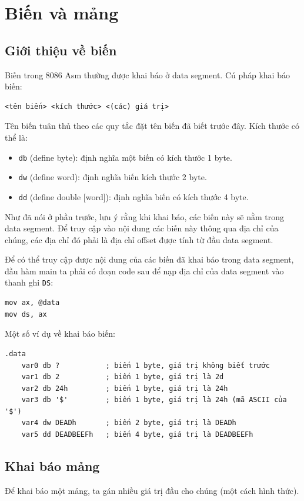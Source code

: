 \documentclass[12pt]{report}
\newcommand{\code}[1]{\texttt{#1}}
\begin{document}
\section{Biến và mảng}
\subsection{Giới thiệu về biến}
Biến trong 8086 Asm thường được khai báo ở data segment.
Cú pháp khai báo biến:
\begin{verbatim}
<tên biến> <kích thước> <(các) giá trị>
\end{verbatim}

Tên biến tuân thủ theo các quy tắc đặt tên biến đã biết trước đây.
Kích thước có thể là:
\begin{itemize}
    \item \code{db} (define byte): định nghĩa một biến có kích thước 1 byte.
    \item \code{dw} (define word): định nghĩa biến kích thước 2 byte.
    \item \code{dd} (define double [word]): định nghĩa biến có kích thước 4 byte.
\end{itemize}

Như đã nói ở phần trước, lưu ý rằng khi khai báo, các biến này sẽ nằm trong data segment. Để truy cập vào nội dung các biến này thông qua địa chỉ của chúng, các địa chỉ đó phải là địa chỉ offset được tính từ đầu data segment.

Để có thể truy cập được nội dung của các biến đã khai báo trong data segment, đầu hàm main ta phải có đoạn code sau để nạp địa chỉ của data segment vào thanh ghi \code{DS}:
\begin{verbatim}
mov ax, @data 
mov ds, ax
\end{verbatim}

Một số ví dụ về khai báo biến:
\begin{verbatim}
.data 
    var0 db ?           ; biến 1 byte, giá trị không biết trước
    var1 db 2           ; biến 1 byte, giá trị là 2d
    var2 db 24h         ; biến 1 byte, giá trị là 24h
    var3 db '$'         ; biến 1 byte, giá trị là 24h (mã ASCII của '$')
    var4 dw DEADh       ; biến 2 byte, giá trị là DEADh
    var5 dd DEADBEEFh   ; biến 4 byte, giá trị là DEADBEEFh
\end{verbatim}

\subsection{Khai báo mảng}
Để khai báo một mảng, ta gán nhiều giá trị đầu cho chúng (một cách hình thức).
\end{document}
